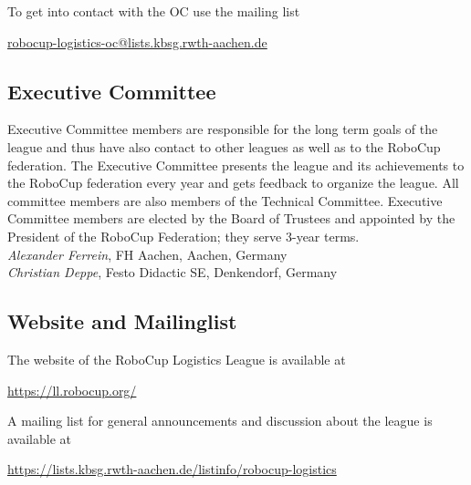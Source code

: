 \documentclass[12pt,twoside]{article}
\begin{document}
\medskip
\noindent To get into contact with the OC use the mailing list\\
\centerline{\url{robocup-logistics-oc@lists.kbsg.rwth-aachen.de}}

\subsection{Executive Committee}
\label{sec:ec}
Executive Committee members are responsible for the long term goals of
the league and thus have also contact to other leagues as well as to
the RoboCup federation. The Executive Committee presents the league
and its achievements to the RoboCup federation every year and gets
feedback to organize the league. All committee members are also
members of the Technical Committee. Executive Committee members are
elected by the Board of Trustees and appointed by the President of the
RoboCup Federation; they serve 3-year terms.\\[.5em]
\emph{Alexander Ferrein}, FH Aachen, Aachen, Germany\\
\emph{Christian Deppe}, Festo Didactic SE, Denkendorf, Germany

\subsection{Website and Mailinglist}
\label{sec:website-ml}
The website of the RoboCup Logistics League is available at\\
\centerline{\url{https://ll.robocup.org/}}

\smallskip
\noindent
A mailing list for general announcements and discussion about the
league is available at\\
\centerline{\url{https://lists.kbsg.rwth-aachen.de/listinfo/robocup-logistics}}

\end{document}
